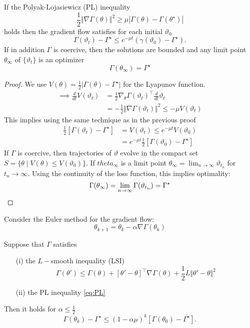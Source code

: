 \begin{theorem}\label{thm:31}
    If the Polyak-Lojasiewicz  
    (PL) inequality 
    \begin{equation}\label{eq:PL}
        \frac{1}{2}\Vert \nabla\Gamma (\theta)\Vert^2\geq \mu |\Gamma(\theta)-\Gamma(\theta^\star)|  
    \end{equation}
    holds then the gradient flow satisfies for each initial \(\vartheta_0\) 
    \[\Gamma(\vartheta_t)-\Gamma^\star\leq e^{-\mu t}(\gamma(\vartheta_0)-\Gamma^\star).\]
    If in addition \(\Gamma\) is coercive, then the solutions are bounded and 
    any limit point \(\theta_\infty\) of \(\{\vartheta_t\}\) is an optimizer 
    \[\Gamma(\theta_\infty)=\Gamma^\star\]
\end{theorem}

\begin{proof}
    We use \(V(\theta)=\frac{1}{2}\vert \Gamma(\theta)-\Gamma^\star\vert\)
    for the Lyapunov function. 
    \begin{align*}
        \implies \frac{d}{dt}V(\vartheta_t)&=\frac{1}{2}\nabla_\theta\Gamma(\vartheta_t)^\intercal \frac{d}{dt}\vartheta_t\\
        &=-\frac{1}{2}\Vert \nabla\Gamma(\vartheta_t)\Vert^2\leq -\mu V(\vartheta_t)
    \end{align*}
    This implies using the same technique as in the previous proof
    \begin{align*}
        \frac{1}{2}\left[\Gamma(\vartheta_t)-\Gamma^\star\right]&=V(\vartheta_t)\leq e^{-\mu t}V(\vartheta_0)\\
        &= e^{-\mu t}\frac{1}{2}\left[\Gamma(\vartheta_0)-\Gamma^\star\right]
    \end{align*}
    If \(\Gamma\) is coercive, then trajectories of \(\vartheta\) evolve
    in the compact set \(S=\{\theta\mid V(\theta)\leq V(\vartheta_0)\}\). If 
    \(theta_\infty\) is a limit point \(\theta_\infty=\lim_{n\to\infty}\vartheta_{t_n}\)
    for \(t_n\to\infty\).
    Using the continuity of the loss function, this implies optimality:
    \[\Gamma(\theta_\infty)=\lim_{n\to\infty}\Gamma(\vartheta_{t_n})=\Gamma^\star\qedhere\] 
\end{proof}
Consider the Euler method for the gradient flow:
\begin{equation}\label{eq:euler-gradient-flow}
    \theta_{k+1}=\theta_k-\alpha \nabla\Gamma(\theta_k)
\end{equation}
\begin{theorem}\label{thm:32}
    Suppose that \(\Gamma\) satisfies
    \begin{enumerate}
        \item[(i)] the \(L-\)smooth inequality (LSI) \[\Gamma(\theta')\leq\Gamma(\theta)+[\theta'-\theta]^\intercal\nabla\Gamma(\theta)+\frac{1}{2}L\Vert \theta'-\theta\Vert^2\]
        \item[(ii)] the PL inequality \ref{eq:PL}  
    \end{enumerate}
    Then it holds for \(\alpha\leq \frac{1}{2}\)
    \[\Gamma(\theta_{k})-\Gamma^\star\leq (1-\alpha\mu)^k[\Gamma(\theta_0)-\Gamma^\star].\]
\end{theorem}

